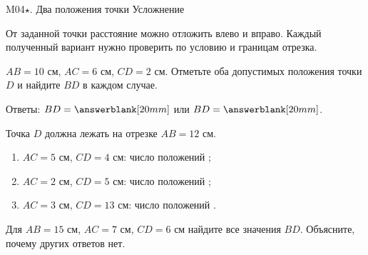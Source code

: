\worksheettitle
  {M04\(\star\). Два положения точки}
  { Усложнение}

\studentnameblock

\begin{notebox}
  От заданной точки расстояние можно отложить влево и вправо. Каждый
  полученный вариант нужно проверить по условию и границам отрезка.
\end{notebox}

\twopositionsfigure

\begin{practicebox}
  $AB=10$ см, $AC=6$ см, $CD=2$ см. Отметьте оба допустимых положения
  точки $D$ и найдите $BD$ в каждом случае.

  \studenttwocasesfigure

  Ответы: $BD=\answerblank[20mm]$ или $BD=\answerblank[20mm]$.
\end{practicebox}

\begin{practicebox}
  Точка $D$ должна лежать на отрезке $AB=12$ см.
  \begin{enumerate}[label=\alph*)]
    \item $AC=5$ см, $CD=4$ см: число положений \answerblank[15mm];
    \item $AC=2$ см, $CD=5$ см: число положений \answerblank[15mm];
    \item $AC=3$ см, $CD=13$ см: число положений \answerblank[15mm].
  \end{enumerate}
\end{practicebox}

\begin{checkpointbox}
  Для $AB=15$ см, $AC=7$ см, $CD=6$ см найдите все значения $BD$.
  Объясните, почему других ответов нет. 
\end{checkpointbox}
